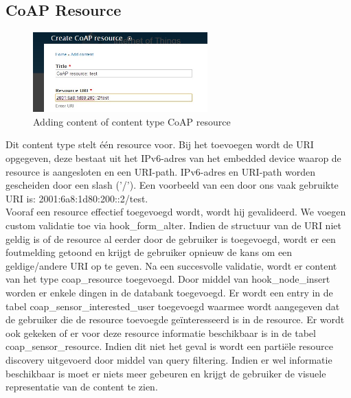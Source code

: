 \subsection{CoAP Resource}
\begin{figure}
\vspace{-10pt}
\centering
\label{fig:addCoapResource}
\includegraphics[width=0.6\textwidth]{fig/add_coap_resource}
\vspace{-20pt}
\centering
\caption{Adding content of content type CoAP resource}
\centering
\vspace{-20pt}
\end{figure}
Dit content type stelt \'{e}\'{e}n resource voor. Bij het toevoegen wordt de URI opgegeven, deze bestaat uit het IPv6-adres van het embedded device waarop de resource is aangesloten en een URI-path. IPv6-adres en URI-path worden gescheiden door een slash ('/'). Een voorbeeld van een door ons vaak gebruikte URI is: 2001:6a8:1d80:200::2/test.\\
Vooraf een resource effectief toegevoegd wordt, wordt hij gevalideerd. We voegen custom validatie toe via hook\_form\_alter. Indien de structuur van de URI niet geldig is of de resource al eerder door de gebruiker is toegevoegd, wordt er een foutmelding getoond en krijgt de gebruiker opnieuw de kans om een geldige/andere URI op te geven. Na een succesvolle validatie, wordt er content van het type coap\_resource toegevoegd. Door middel van hook\_node\_insert worden er enkele dingen in de databank toegevoegd. Er wordt een entry in de tabel coap\_sensor\_interested\_user toegevoegd waarmee wordt aangegeven dat de gebruiker die de resource toevoegde ge\"{i}nteresseerd is in de resource. Er wordt ook gekeken of er voor deze resource informatie beschikbaar is in de tabel coap\_sensor\_resource. Indien dit niet het geval is wordt een parti\"{e}le resource discovery uitgevoerd door middel van query filtering. Indien er wel informatie beschikbaar is moet er niets meer gebeuren en krijgt de gebruiker de visuele representatie van de content te zien.\\

